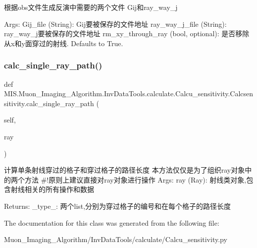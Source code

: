 \begin{DoxyVerb}根据obs文件生成反演中需要的两个文件
Gij和ray_way_j

Args:
    Gij_file (String): Gij要被保存的文件地址
    ray_way_j_file (String): ray_way_j要被保存的文件地址
    rm_xy_through_ray (bool, optional): 是否移除从x和y面穿过的射线. Defaults to True.
\end{DoxyVerb}
 \mbox{\label{classMIS_1_1Muon__Imaging__Algorithm_1_1InvDataTools_1_1calculate_1_1Calcu__sensitivity_1_1Calcsensitivity_ac24d10720bebf7df0ae66fdadefb4e3c}} 
\subsubsection{\texorpdfstring{calc\+\_\+single\+\_\+ray\+\_\+path()}{calc\_single\_ray\_path()}}
{\footnotesize\ttfamily def M\+I\+S.\+Muon\+\_\+\+Imaging\+\_\+\+Algorithm.\+Inv\+Data\+Tools.\+calculate.\+Calcu\+\_\+sensitivity.\+Calcsensitivity.\+calc\+\_\+single\+\_\+ray\+\_\+path (\begin{DoxyParamCaption}\item[{}]{self,  }\item[{}]{ray }\end{DoxyParamCaption})}

\begin{DoxyVerb}计算单条射线穿过的格子和穿过格子的路径长度
本方法仅仅是为了组织ray对象中的两个方法
#!原则上建议直接对ray对象进行操作
Args:
    ray (Ray): 射线类对象,包含射线相关的所有操作和数据

Returns:
    _type_: 两个list,分别为穿过格子的编号和在每个格子的路径长度
\end{DoxyVerb}
 

The documentation for this class was generated from the following file\+:\begin{DoxyCompactItemize}
\item 
Muon\+\_\+\+Imaging\+\_\+\+Algorithm/\+Inv\+Data\+Tools/calculate/Calcu\+\_\+sensitivity.\+py\end{DoxyCompactItemize}
